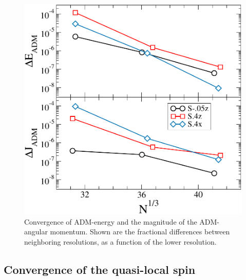 {\begin{figure}
\includegraphics[width=0.95\columnwidth]{chap2/EADMConvergence}
\caption[Convergence of ADM-energy and of the ADM-angular momentum magnitude.]{{\label{fig:EADMConvergence}} Convergence of ADM-energy and the magnitude of the ADM-angular momentum.  Shown are the fractional differences between neighboring resolutions, as a function of the lower resolution.
}
\end{figure}




















\subsection{Convergence of the quasi-local spin}

}
